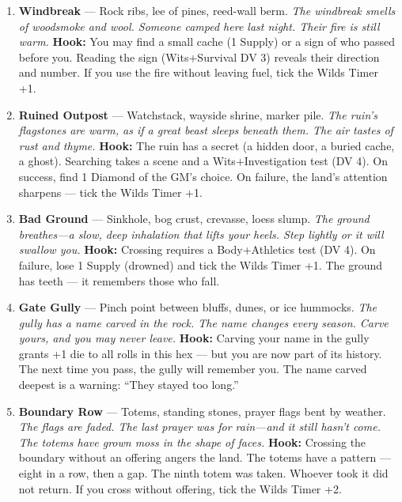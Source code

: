 \begin{enumerate}
\item \textbf{Windbreak} --- Rock ribs, lee of pines, reed-wall berm.
  \hfill \textit{The windbreak smells of woodsmoke and wool. Someone camped here last night. Their fire is still warm.}
  \textbf{Hook:} You may find a small cache (1 Supply) or a sign of who passed before you. Reading the sign (Wits+Survival DV 3) reveals their direction and number. If you use the fire without leaving fuel, tick the Wilds Timer +1.
  
\item \textbf{Ruined Outpost} --- Watchstack, wayside shrine, marker pile.
  \hfill \textit{The ruin's flagstones are warm, as if a great beast sleeps beneath them. The air tastes of rust and thyme.}
  \textbf{Hook:} The ruin has a secret (a hidden door, a buried cache, a ghost). Searching takes a scene and a Wits+Investigation test (DV 4). On success, find 1 Diamond of the GM's choice. On failure, the land's attention sharpens --- tick the Wilds Timer +1.
  
\item \textbf{Bad Ground} --- Sinkhole, bog crust, crevasse, loess slump.
  \hfill \textit{The ground breathes---a slow, deep inhalation that lifts your heels. Step lightly or it will swallow you.}
  \textbf{Hook:} Crossing requires a Body+Athletics test (DV 4). On failure, lose 1 Supply (drowned) and tick the Wilds Timer +1. The ground has teeth --- it remembers those who fall.
  
\item \textbf{Gate Gully} --- Pinch point between bluffs, dunes, or ice hummocks.
  \hfill \textit{The gully has a name carved in the rock. The name changes every season. Carve yours, and you may never leave.}
  \textbf{Hook:} Carving your name in the gully grants +1 die to all rolls in this hex --- but you are now part of its history. The next time you pass, the gully will remember you. The name carved deepest is a warning: ``They stayed too long.''
  
\item[J] \textbf{Boundary Row} --- Totems, standing stones, prayer flags bent by weather.
  \hfill \textit{The flags are faded. The last prayer was for rain---and it still hasn't come. The totems have grown moss in the shape of faces.}
  \textbf{Hook:} Crossing the boundary without an offering angers the land. The totems have a pattern --- eight in a row, then a gap. The ninth totem was taken. Whoever took it did not return. If you cross without offering, tick the Wilds Timer +2.
  

\end{enumerate}
